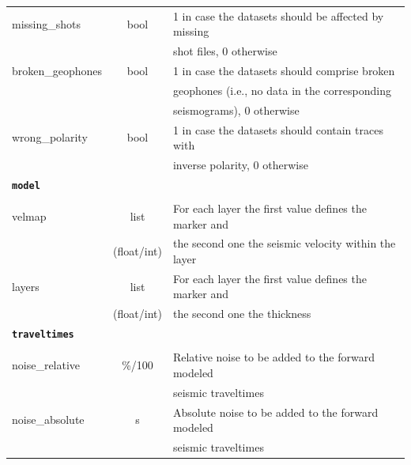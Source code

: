 \documentclass[a4paper,fleqn]{cas-sc}
\begin{document}
\begin{table}[]
\begin{tabular*}{\tblwidth}{@{} LCL@{}}
        missing\_shots & bool & 1 in case the datasets should be affected by missing \\
         & & shot files, 0 otherwise \\
        broken\_geophones & bool & 1 in case the datasets should comprise broken \\
         & & geophones (i.e., no data in the corresponding \\
         & & seismograms), 0 otherwise \\
        wrong\_polarity & bool & 1 in case the datasets should contain traces with \\
         & & inverse polarity, 0 otherwise \\
        \midrule
        \textbf{\texttt{model}} & & \\
         & & \\
        velmap & list & For each layer the first value defines the marker and \\
         & (float/int) & the second one the seismic velocity within the layer \\
        layers & list & For each layer the first value defines the marker and \\
         & (float/int) & the second one the thickness \\
        \midrule
        \textbf{\texttt{traveltimes}} & & \\
         & & \\
        noise\_relative & \%/100 & Relative noise to be added to the forward modeled \\
      	 & & seismic traveltimes \\
        noise\_absolute & s & Absolute noise to be added to the forward modeled \\
         & & seismic traveltimes\\
        \bottomrule
    \end{tabular*}
    \label{tab:config}
\end{table}

\end{document}

